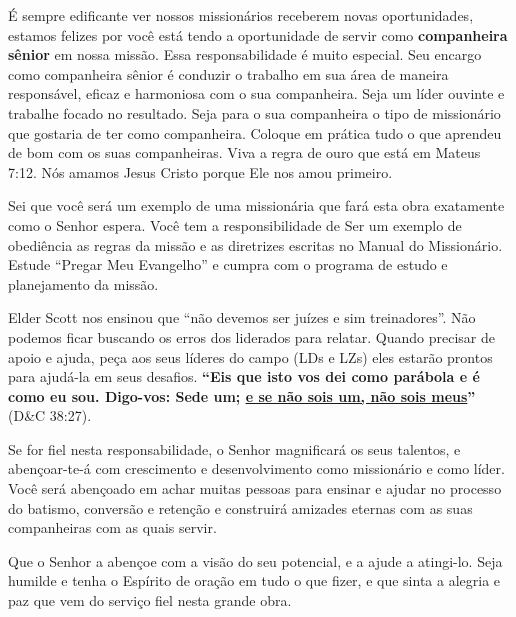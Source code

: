 \'E sempre edificante ver nossos mission\'arios receberem novas oportunidades, estamos felizes por voc\^e est\'a tendo a oportunidade de servir como \textbf{companheira s\^enior} em nossa miss\~ao. Essa responsabilidade \'e muito especial. Seu encargo como companheira s\^enior \'e conduzir o trabalho em sua \'area de maneira respons\'avel, eficaz e harmoniosa com o sua companheira. Seja um l\'ider ouvinte e trabalhe focado no resultado. Seja para o sua companheira o tipo de mission\'ario que gostaria de ter como companheira. Coloque em pr\'atica tudo o que aprendeu de bom com os suas companheiras. Viva a regra de ouro que est\'a em Mateus 7:12. N\'os amamos Jesus Cristo porque Ele nos amou primeiro.

Sei que voc\^e ser\'a um exemplo de uma mission\'aria que far\'a esta obra exatamente como o Senhor espera. Voc\^e tem a responsibilidade de Ser um exemplo de obedi\^encia as regras da miss\~ao e as diretrizes escritas no Manual do Mission\'ario. Estude ``Pregar Meu Evangelho'' e cumpra com o programa de estudo e planejamento da miss\~ao.

Elder Scott nos ensinou que ``n\~ao devemos ser ju\'izes e sim treinadores''. N\~ao podemos ficar buscando os erros dos liderados para relatar. Quando precisar de apoio e ajuda, pe\c ca aos seus l\'ideres do campo (LDs e LZs) eles estar\~ao prontos para ajud\'a-la em seus desafios. \textbf{``Eis que isto vos dei como par\'abola e \'e como eu sou. Digo-vos: Sede um; \underline{e se n\~ao sois um, n\~ao sois meus}''} (D\&C 38:27).

Se for fiel nesta responsabilidade, o Senhor magnificar\'a os seus talentos, e aben\c coar-te-\'a com crescimento e desenvolvimento como mission\'ario e como l\'ider. Voc\^e ser\'a aben\c coado em achar muitas pessoas para ensinar e ajudar no processo do batismo, convers\~ao e reten\c c\~ao e construir\'a amizades eternas com as suas companheiras com as quais servir.

Que o Senhor a aben\c coe com a vis\~ao do seu potencial, e a ajude a atingi-lo. Seja humilde e tenha o Esp\'irito de ora\c c\~ao em tudo o que fizer, e que sinta a alegria e paz que vem do servi\c co fiel nesta grande obra.
